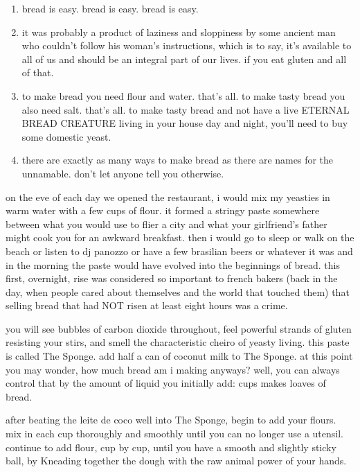 \begin{enumerate}

  \item bread is easy. bread is easy. bread is easy.

  \item it was probably a product of laziness and sloppiness by some
  ancient man who couldn't follow his woman's instructions,
  which is to say, it's available to all of us and should be an
  integral part of our lives. if you eat gluten and all of that.

  \item to make bread you need flour and water. that's all. to make
  tasty bread you also need salt. that's all. to make tasty bread
  and not have a live ETERNAL BREAD CREATURE living in your house day
  and night, you'll need to buy some domestic yeast.

  \item there are exactly as many ways to make bread as there are
  names for the unnamable. don't let anyone tell you otherwise.

\end{enumerate}

on the eve of each day we opened the restaurant, i would mix my
yeasties in warm water with a few cups of flour. it formed a stringy
paste somewhere between what you would use to flier a city and what
your girlfriend's father might cook you for an awkward
breakfast. then i would go to sleep or walk on the beach or listen to
dj panozzo or have a few brasilian beers or whatever it was and in the
morning the paste would have evolved into the beginnings of
bread. this first, overnight, rise was considered so important to
french bakers (back in the day, when people cared about themselves and
the world that touched them) that selling bread that had NOT risen at
least eight hours was a crime.

you will see bubbles of carbon dioxide throughout, feel powerful
strands of gluten resisting your stirs, and smell the characteristic
\gls{cheiro} of yeasty living. this
paste is called The Sponge. add half a can of coconut milk to The
Sponge. at this point you may wonder, how much bread am i making
anyways? well, you can always control that by the amount of liquid you
initially add:  cups makes  loaves of bread.

after beating the \gls{leite de coco} well into The Sponge, begin to add your flours. mix in each cup
thoroughly and smoothly until you can no longer use a
utensil. continue to add flour, cup by cup, until you have a smooth
and slightly sticky ball, by Kneading together the dough with the raw
animal power of your hands.

